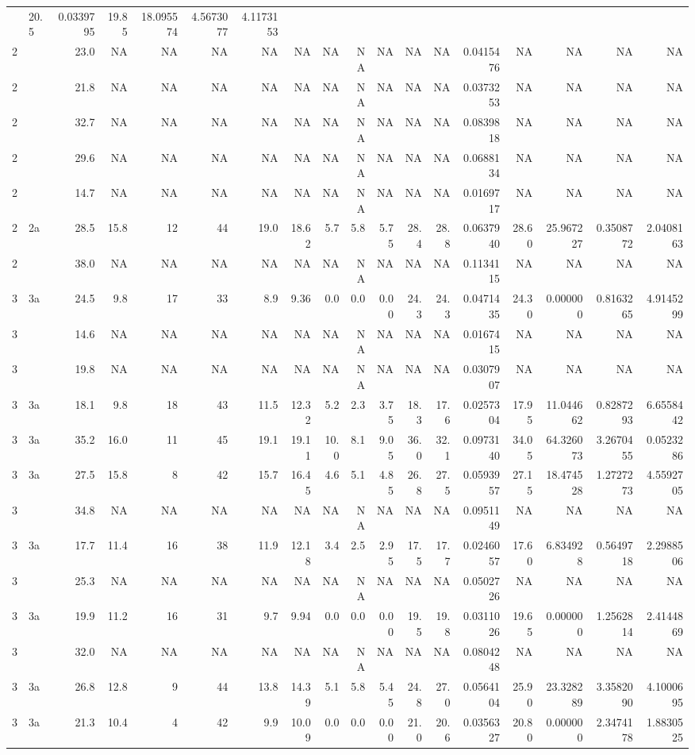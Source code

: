 \documentclass[letterpaper,9pt,twocolumn,twoside,]{pinp}
\begin{document}
\begin{longtable}[]{@{}llrrrrrrrrrrrrrrrr@{}}
& 20.5 & 0.0339795 & 19.85 & 18.095574 & 4.5673077 &
4.1173153\tabularnewline
2 & & 23.0 & NA & NA & NA & NA & NA & NA & NA & NA & NA & NA & 0.0415476
& NA & NA & NA & NA\tabularnewline
2 & & 21.8 & NA & NA & NA & NA & NA & NA & NA & NA & NA & NA & 0.0373253
& NA & NA & NA & NA\tabularnewline
2 & & 32.7 & NA & NA & NA & NA & NA & NA & NA & NA & NA & NA & 0.0839818
& NA & NA & NA & NA\tabularnewline
2 & & 29.6 & NA & NA & NA & NA & NA & NA & NA & NA & NA & NA & 0.0688134
& NA & NA & NA & NA\tabularnewline
2 & & 14.7 & NA & NA & NA & NA & NA & NA & NA & NA & NA & NA & 0.0169717
& NA & NA & NA & NA\tabularnewline
2 & 2a & 28.5 & 15.8 & 12 & 44 & 19.0 & 18.62 & 5.7 & 5.8 & 5.75 & 28.4
& 28.8 & 0.0637940 & 28.60 & 25.967227 & 0.3508772 &
2.0408163\tabularnewline
2 & & 38.0 & NA & NA & NA & NA & NA & NA & NA & NA & NA & NA & 0.1134115
& NA & NA & NA & NA\tabularnewline
3 & 3a & 24.5 & 9.8 & 17 & 33 & 8.9 & 9.36 & 0.0 & 0.0 & 0.00 & 24.3 &
24.3 & 0.0471435 & 24.30 & 0.000000 & 0.8163265 &
4.9145299\tabularnewline
3 & & 14.6 & NA & NA & NA & NA & NA & NA & NA & NA & NA & NA & 0.0167415
& NA & NA & NA & NA\tabularnewline
3 & & 19.8 & NA & NA & NA & NA & NA & NA & NA & NA & NA & NA & 0.0307907
& NA & NA & NA & NA\tabularnewline
3 & 3a & 18.1 & 9.8 & 18 & 43 & 11.5 & 12.32 & 5.2 & 2.3 & 3.75 & 18.3 &
17.6 & 0.0257304 & 17.95 & 11.044662 & 0.8287293 &
6.6558442\tabularnewline
3 & 3a & 35.2 & 16.0 & 11 & 45 & 19.1 & 19.11 & 10.0 & 8.1 & 9.05 & 36.0
& 32.1 & 0.0973140 & 34.05 & 64.326073 & 3.2670455 &
0.0523286\tabularnewline
3 & 3a & 27.5 & 15.8 & 8 & 42 & 15.7 & 16.45 & 4.6 & 5.1 & 4.85 & 26.8 &
27.5 & 0.0593957 & 27.15 & 18.474528 & 1.2727273 &
4.5592705\tabularnewline
3 & & 34.8 & NA & NA & NA & NA & NA & NA & NA & NA & NA & NA & 0.0951149
& NA & NA & NA & NA\tabularnewline
3 & 3a & 17.7 & 11.4 & 16 & 38 & 11.9 & 12.18 & 3.4 & 2.5 & 2.95 & 17.5
& 17.7 & 0.0246057 & 17.60 & 6.834928 & 0.5649718 &
2.2988506\tabularnewline
3 & & 25.3 & NA & NA & NA & NA & NA & NA & NA & NA & NA & NA & 0.0502726
& NA & NA & NA & NA\tabularnewline
3 & 3a & 19.9 & 11.2 & 16 & 31 & 9.7 & 9.94 & 0.0 & 0.0 & 0.00 & 19.5 &
19.8 & 0.0311026 & 19.65 & 0.000000 & 1.2562814 &
2.4144869\tabularnewline
3 & & 32.0 & NA & NA & NA & NA & NA & NA & NA & NA & NA & NA & 0.0804248
& NA & NA & NA & NA\tabularnewline
3 & 3a & 26.8 & 12.8 & 9 & 44 & 13.8 & 14.39 & 5.1 & 5.8 & 5.45 & 24.8 &
27.0 & 0.0564104 & 25.90 & 23.328289 & 3.3582090 &
4.1000695\tabularnewline
3 & 3a & 21.3 & 10.4 & 4 & 42 & 9.9 & 10.09 & 0.0 & 0.0 & 0.00 & 21.0 &
20.6 & 0.0356327 & 20.80 & 0.000000 & 2.3474178 &
1.8830525\tabularnewline

\end{longtable}
\end{document}
